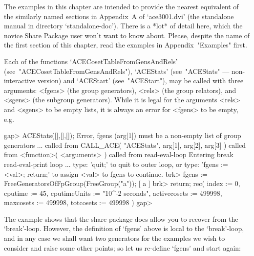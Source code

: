

The examples in this chapter  are  intended  to  provide  the  nearest
{\GAP} equivalent of the similarly named  sections  in  Appendix~A  of
`ace3001.dvi' (the standalone manual in  directory  `standalone-doc').
There is a *lot* of detail here, which the novice {\ACE} Share Package
user won't want to know about. Please, despite the name of  the  first
section of this chapter,  read  the  examples  in  Appendix~"Examples"
first.


Each     of     the      functions      `ACECosetTableFromGensAndRels'
(see~"ACECosetTableFromGensAndRels"), `ACEStats'  (see~"ACEStats"  ---
non-interactive  version)  and  `ACEStart'  (see~"ACEStart"),  may  be
called with three arguments: <fgens> (the  group  generators),  <rels>
(the group relators), and <sgens> (the subgroup generators). While  it
is legal for the arguments <rels> and <sgens> to be empty lists, it is
always an error for <fgens> to be empty, e.g.

\beginexample
gap> ACEStats([],[],[]);
Error, fgens (arg[1]) must be a non-empty list of group generators ...
 called from
CALL_ACE( "ACEStats", arg[1], arg[2], arg[3] ) called from
<function>( <arguments> ) called from read-eval-loop
Entering break read-eval-print loop ...
 type: 'quit;' to quit to outer loop, or
 type: 'fgens := <val>; return;' to assign <val> to fgens to continue.
brk> fgens := FreeGeneratorsOfFpGroup(FreeGroup("a"));
[ a ]
brk> return;
rec( index := 0, cputime := 45, cputimeUnits := "10^-2 seconds", 
  activecosets := 499998, maxcosets := 499998, totcosets := 499998 )
gap>
\endexample

The example shows that the {\ACE} share  package  does  allow  you  to
recover from the `break'-loop.  However,  the  definition  of  `fgens'
above is local to the `break'-loop, and in any case we shall want  two
generators for the examples we wish to consider and raise  some  other
points; so let us re-define `fgens' and start again:


